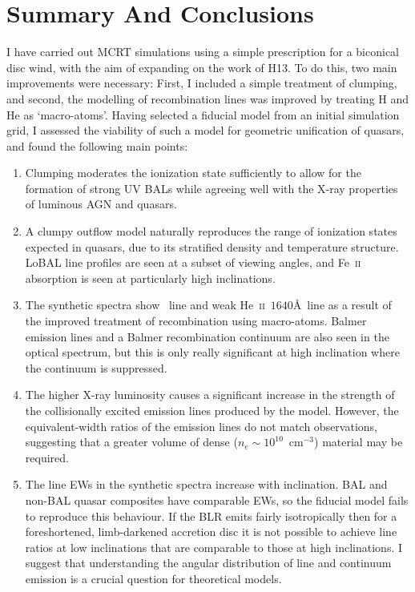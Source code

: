 \section{Summary And Conclusions}
\label{sec:qso_conclusions}
I have carried out MCRT simulations using a simple
prescription for a biconical disc wind, with
the aim of expanding on the work of H13. To do this, two main
improvements were necessary: First, I included a simple treatment of 
clumping, and second, 
the modelling of recombination lines was improved by treating H and He as
`macro-atoms'. 
Having selected a fiducial model from an initial simulation grid,
I assessed the viability of such a model for geometric 
unification of quasars, and found the following main points:
\begin{enumerate}
\item Clumping moderates the ionization state
sufficiently to allow for the 
formation of strong UV BALs while agreeing well with the X-ray
properties of luminous AGN and quasars. 
\smallskip
\item A clumpy outflow model naturally 
reproduces the range of ionization states
expected in quasars, due to its stratified density
and temperature structure. 
LoBAL line profiles are seen at a subset of viewing angles, and Fe~\textsc{ii}
absorption is seen at particularly high inclinations. 
\smallskip
\item The synthetic spectra show \la\ line and weak He~\textsc{ii}~$1640$\AA\ line
as a result of the improved treatment of recombination using macro-atoms. 
Balmer emission lines and a Balmer recombination continuum are also
seen in the optical spectrum, but this
is only really significant at high inclination where 
the continuum is suppressed.  
\smallskip
\item The higher X-ray luminosity causes a significant 
increase in the strength of the collisionally excited emission
lines produced by the model. 
However, the equivalent-width ratios of the emission lines do not match
observations, suggesting that a greater volume of dense ($n_e\sim10^{10}$~cm$^{-3}$)
material may be required.
\smallskip
\item The line EWs in the synthetic spectra increase with inclination.
BAL and non-BAL quasar composites have comparable EWs, so the fiducial model
fails to reproduce this behaviour.
 If the BLR emits fairly isotropically then for a 
foreshortened, limb-darkened accretion disc 
it is not possible to achieve line ratios at low inclinations 
that are comparable to those at high inclinations. 
I suggest that understanding the angular distribution of 
line and continuum emission is a crucial question for theoretical models.
\end{enumerate}
